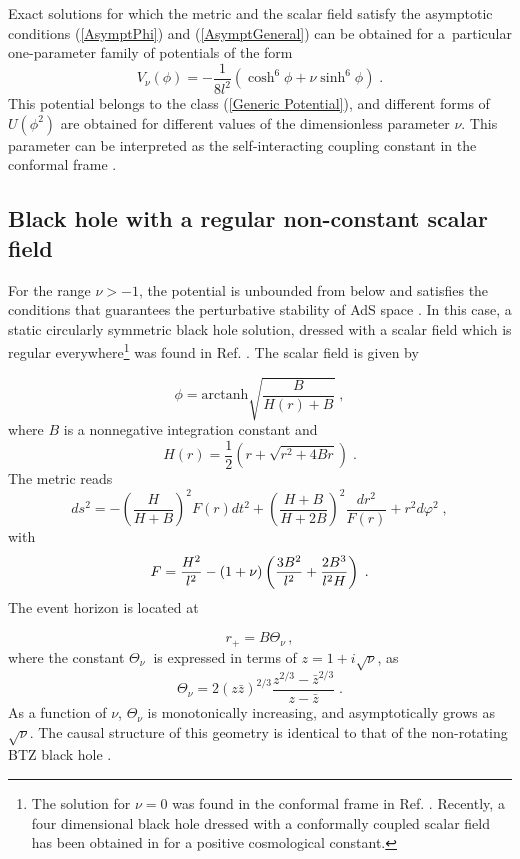 \documentclass[a4paper,12pt]{article}
\begin{document}
Exact solutions for which the metric and the scalar field satisfy the
asymptotic conditions (\ref{AsymptPhi}) and (\ref{AsymptGeneral}) can be obtained
for a\ particular one-parameter family of potentials of the form \cite{HMTZ} 
\begin{equation}
V_{\nu }(\phi )=-\frac{1}{8l^{2}}\left( \cosh ^{6}\phi +\nu \sinh ^{6}\phi
\right) \;.  \label{The Potential}
\end{equation}
This potential belongs to the class (\ref{Generic Potential}), and different
forms of $U(\phi ^{2})$ are obtained for different values of the
dimensionless parameter $\nu $. This parameter can be interpreted as the
self-interacting coupling constant in the conformal frame \cite{HMTZ}.

\subsection{Black hole with a regular non-constant scalar field}

For the range $\nu >-1$, the potential is unbounded from below and satisfies
the conditions that guarantees the perturbative stability of AdS space \cite
{M-T}. In this case, a static circularly symmetric black hole solution,
dressed with a scalar field which is regular everywhere\footnote{%
The solution for $\nu =0$ was found in the conformal frame in Ref. \cite
{Martinez:1996gn}. Recently, a four dimensional black hole dressed with a
conformally coupled scalar field has been obtained in \cite{Martinez:2002ru}
for a positive cosmological constant.} was found in Ref. \cite{HMTZ}. The
scalar field is given by

\begin{equation}
\phi =\textrm{arctanh}\sqrt{\frac{B}{H(r)+B}}\;,  \label{Scalar}
\end{equation}
where $B$ is a nonnegative integration constant and 
\[
H(r)=\frac{1}{2}\left( r+\sqrt{r^{2}+4Br}\right) \;.
\]
The metric reads 
\begin{equation}
ds^{2}=-\left( \frac{H}{H+B}\right) ^{2}F(r)dt^{2}+\left( \frac{H+B}{H+2B}%
\right) ^{2}\frac{dr^{2}}{F(r)}+r^{2}d\varphi ^{2}\;,  \label{The metric}
\end{equation}
with 
\[
F=\frac{H^{2}}{l^{2}}-(1+\nu )\left( \frac{3B^{2}}{l^{2}}+\frac{2B^{3}}{%
l^{2}H}\right) \;.
\]
The event horizon is located at

\[
r_{+}=B\Theta _{\nu }\,, 
\]
where the constant $\Theta _{\nu }$\textbf{\ }is expressed in terms of $z=1+i%
\sqrt{\nu }$, as 
\begin{equation}
\Theta _{\nu }=2(z\bar{z})^{2/3}\frac{z^{2/3}-\bar{z}^{2/3}}{z-\bar{z}}\;.
\label{Schuster}
\end{equation}
As a function of $\nu $, $\Theta _{\nu }$ is monotonically increasing, and
asymptotically grows as $\sqrt{\nu }$. The causal structure of this geometry
is identical to that of the non-rotating BTZ black hole \cite{BTZ}.
\end{document}
